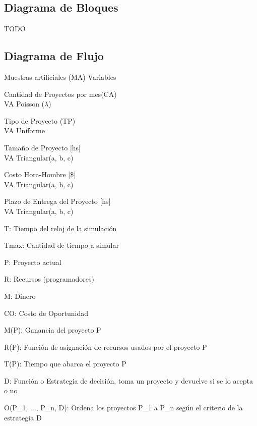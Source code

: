 \documentclass[a4paper,10pt]{article}
\begin{document}
\subsection{Diagrama de Bloques}
TODO

\clearpage
\subsection{Diagrama de Flujo}

\begin{multicols}{2}
Muestras artificiales (MA)
Variables

\begin{enumerate*}
    \item Cantidad de Proyectos por mes(CA)\\
            VA Poisson ($\lambda$)
    \item Tipo de Proyecto (TP)\\
            VA Uniforme
    \item Tamaño de Proyecto [hs]\\
            VA Triangular(a, b, c)
    \item Costo Hora-Hombre [\$]\\
            VA Triangular(a, b, c)
    \item Plazo de Entrega del Proyecto [hs]\\
            VA Triangular(a, b, c)
\end{enumerate*}
\vfill
\columnbreak
\begin{itemize*}
 \item T: Tiempo del reloj de la simulación
 \item Tmax: Cantidad de tiempo a simular
 \item P: Proyecto actual
 \item R: Recursos (programadores)
 \item M: Dinero
 \item CO: Costo de Oportunidad
 \item M(P): Ganancia del proyecto P
 \item R(P): Función de asignación de recursos usados por el proyecto P
 \item T(P): Tiempo que abarca el proyecto P
 \item D: Función o Estrategia de decisión, toma un proyecto y devuelve si se lo acepta o no
 \item O(P\_1, ..., P\_n, D): Ordena los proyectos P\_1 a P\_n según el criterio de la estrategia D

\end{itemize*}

\end{multicols}
\end{document}
